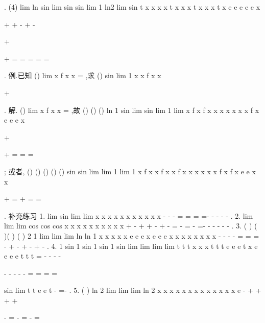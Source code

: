 \Lambda 
\Lambda 
. 
(4)
lim
ln sin
lim
sin
sin
lim
1 ln2
lim sin
t
x
x
x
x
t
x
x
x
t
x
x
x
t
x
e
e
e
e
e
x
\to \infty 
\to \infty 
\to 








+
+
-
+
-




+




\to \infty 


+
=
=
=
=
=




. 
\textcolor{lyred}{例}.已知
()
lim
x
f x
x
\to 
=
,求
()
sin
lim 1
x
x
f x
x
\to 


+




. 
解.
()
lim
x
f x
x
\to 
=
,故
()
()
()
ln 1
sin
lim
sin
lim 1
lim
x
f x
f x
x
x
x
x
x
x
f x
e
e
e
x
\to 


+




\to 
\to 


+
=
=
=




; 
或者,
()
()
()
()
()
sin
sin
lim
lim 1
lim 1
x
f x
x
f x
x
f x
x
x
x
x
x
f x
f x
e
e
x
x
\to 
\cdots 
\cdots 
\to 
\to 




+
=
+
=
=








. 
\textcolor{lyred}{补充练习 }
1.
lim
sin
lim
lim
x
x
x
x
x
x
x
x
x
x
x
\to -\infty 
\to -\infty 
\to -\infty 
=
\cdots 
=
=
=-
-
-
-
-
. 
2.
lim
lim
lim
cos
cos
cos
x
x
x
x
x
x
x
x
x
x
\to 
\to 
\to 
+
-
+
+
-
+
-
=
-
=
-
=-
-
-
-
-
-
. 
3.
(
)
(
)(
)
(
)
2 1
lim
lim
lim
ln
ln 1
x
x
x
x
x
e
e
e
x
e
e
e
x x
x
x
x
x
x
x
-
\to 
\to 
\to 
-
-
-
=
=
=
-
+
-
+
-
+
-
. 
4.
1 sin
1 sin
1 sin
1 sin
lim
lim
lim
lim
t
t
t
x
x
x
t
t
t
e
e
e
t
x e
e
e
e
t
t
t
=
-
-
-
-
\to \infty 
\to 
\to 
\to 


-
-
-
-
-
=
=
=
=






sin
lim
t
t
e
e
t
\to 
-
=-
. 
5.
(
)
ln 2
lim
lim
lim
ln 2
x x
x
x
x
x
x
x
x
x
x
x
x
e
-
+
+
+
+
\to \infty 
\to \infty 
\to \infty 






-
=
-
=
-
=














